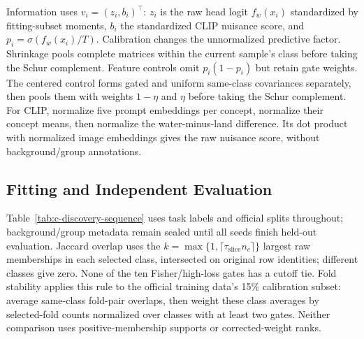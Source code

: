 Information uses $v_i=(z_i,b_i)^\top$: $z_i$ is the raw head logit $f_w(x_i)$ standardized by fitting-subset moments, $b_i$ the standardized CLIP nuisance score, and $p_i=\sigma(f_w(x_i)/T)$. Calibration changes the unnormalized predictive factor. Shrinkage pools complete matrices within the current sample's class before taking the Schur complement. Feature controls omit $p_i(1-p_i)$ but retain gate weights. The centered control forms gated and uniform same-class covariances separately, then pools them with weights $1-\eta$ and $\eta$ before taking the Schur complement. For CLIP, normalize five prompt embeddings per concept, normalize their concept means, then normalize the water-minus-land difference. Its dot product with normalized image embeddings gives the raw nuisance score, without background/group annotations.

\subsection{Fitting and Independent Evaluation}
\label{app:discovery-crossfit}
Table~\ref{tab:c-discovery-sequence} uses task labels and official splits throughout; background/group metadata remain sealed until all seeds finish held-out evaluation.
Jaccard overlap uses the $k=\max\{1,\lceil\tau_{\mathrm{slice}}n_c\rceil\}$ largest raw memberships in each selected class, intersected on original row identities; different classes give zero. None of the ten Fisher/high-loss gates has a cutoff tie. Fold stability applies this rule to the official training data's 15\% calibration subset: average same-class fold-pair overlaps, then weight these class averages by selected-fold counts normalized over classes with at least two gates. Neither comparison uses positive-membership supports or corrected-weight ranks.

